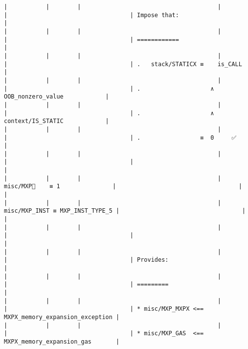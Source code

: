 \documentclass[varwidth=\maxdimen,margin=0.5cm,multi={verbatim}]{standalone}
\begin{document}
\begin{verbatim}
|           |        |                                       |                                 |                                   | Impose that:                                        |
|           |        |                                       |                                 |                                   | ============                                        |
|           |        |                                       |                                 |                                   | .   stack/STATICX ≡    is_CALL                      |
|           |        |                                       |                                 |                                   | .                    ∧ OOB_nonzero_value            |
|           |        |                                       |                                 |                                   | .                    ∧ context/IS_STATIC            |
|           |        |                                       |                                 |                                   | .                 ≡  0     ✅                       |
|           |        |                                       |                                 |                                   |                                                     |
|           |        |                                       | misc/MXP🚩    ≡ 1               |                                   |                                                     |
|           |        |                                       | misc/MXP_INST ≡ MXP_INST_TYPE_5 |                                   |                                                     |
|           |        |                                       |                                 |                                   |                                                     |
|           |        |                                       |                                 |                                   | Provides:                                           |
|           |        |                                       |                                 |                                   | =========                                           |
|           |        |                                       |                                 |                                   | * misc/MXP_MXPX <== MXPX_memory_expansion_exception |
|           |        |                                       |                                 |                                   | * misc/MXP_GAS  <== MXPX_memory_expansion_gas       |

\end{verbatim}
\end{document}
